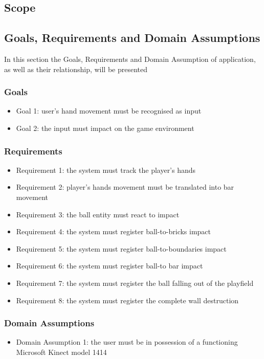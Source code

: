 \documentclass[]{article}
\begin{document}
\subsection{Scope}
\subsection{Goals, Requirements and Domain Assumptions}
In this section the Goals, Requirements and Domain Assumption of application, as well as their relationship, will be presented
\subsubsection{Goals}
\begin{itemize}
	\item Goal 1: user's hand movement must be recognised as input
	\item Goal 2: the input must impact on the game environment
\end{itemize}
\subsubsection{Requirements}
\begin{itemize}
	\item Requirement 1: the system must track the player's hands
	\item Requirement 2: player's hands movement must be translated into bar movement
	\item Requirement 3: the ball entity must react to impact
	\item Requirement 4: the system must register ball-to-bricks impact
	\item Requirement 5: the system must register ball-to-boundaries impact
	\item Requirement 6: the system must register ball-to bar impact
	\item Requirement 7: the system must register the ball falling out of the playfield
	\item Requirement 8: the system must register the complete wall destruction 
\end{itemize}
\subsubsection{Domain Assumptions}
\begin{itemize}
	\item Domain Assumption 1: the user must be in possession of a functioning Microsoft Kinect model 1414 
\end{itemize}
\end{document}
